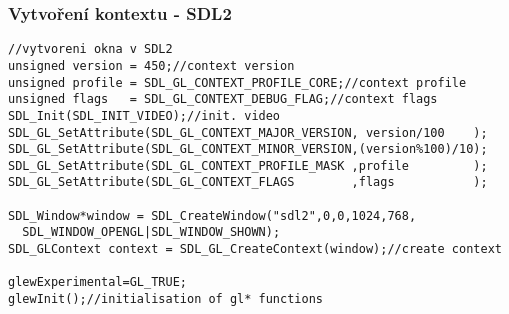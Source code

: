 \begin{frame}[fragile]
\frametitle{Vytvoření kontextu - SDL2}
	{\scriptsize
\begin{verbatim}
//vytvoreni okna v SDL2
unsigned version = 450;//context version
unsigned profile = SDL_GL_CONTEXT_PROFILE_CORE;//context profile
unsigned flags   = SDL_GL_CONTEXT_DEBUG_FLAG;//context flags
SDL_Init(SDL_INIT_VIDEO);//init. video
SDL_GL_SetAttribute(SDL_GL_CONTEXT_MAJOR_VERSION, version/100    );
SDL_GL_SetAttribute(SDL_GL_CONTEXT_MINOR_VERSION,(version%100)/10);
SDL_GL_SetAttribute(SDL_GL_CONTEXT_PROFILE_MASK ,profile         );
SDL_GL_SetAttribute(SDL_GL_CONTEXT_FLAGS        ,flags           );

SDL_Window*window = SDL_CreateWindow("sdl2",0,0,1024,768,
  SDL_WINDOW_OPENGL|SDL_WINDOW_SHOWN);
SDL_GLContext context = SDL_GL_CreateContext(window);//create context

glewExperimental=GL_TRUE;
glewInit();//initialisation of gl* functions
	\end{verbatim}
	}
\end{frame}



